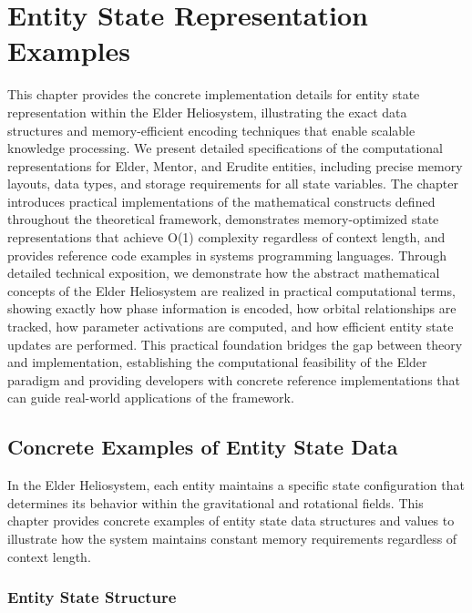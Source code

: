 \chapter{Entity State Representation Examples}

\begin{tcolorbox}[colback=blue!5!white,colframe=blue!75!black,title=Chapter Summary]
This chapter provides the concrete implementation details for entity state representation within the Elder Heliosystem, illustrating the exact data structures and memory-efficient encoding techniques that enable scalable knowledge processing. We present detailed specifications of the computational representations for Elder, Mentor, and Erudite entities, including precise memory layouts, data types, and storage requirements for all state variables. The chapter introduces practical implementations of the mathematical constructs defined throughout the theoretical framework, demonstrates memory-optimized state representations that achieve O(1) complexity regardless of context length, and provides reference code examples in systems programming languages. Through detailed technical exposition, we demonstrate how the abstract mathematical concepts of the Elder Heliosystem are realized in practical computational terms, showing exactly how phase information is encoded, how orbital relationships are tracked, how parameter activations are computed, and how efficient entity state updates are performed. This practical foundation bridges the gap between theory and implementation, establishing the computational feasibility of the Elder paradigm and providing developers with concrete reference implementations that can guide real-world applications of the framework.
\end{tcolorbox}

\section{Concrete Examples of Entity State Data}

In the Elder Heliosystem, each entity maintains a specific state configuration that determines its behavior within the gravitational and rotational fields. This chapter provides concrete examples of entity state data structures and values to illustrate how the system maintains constant memory requirements regardless of context length.

\subsection{Entity State Structure}

